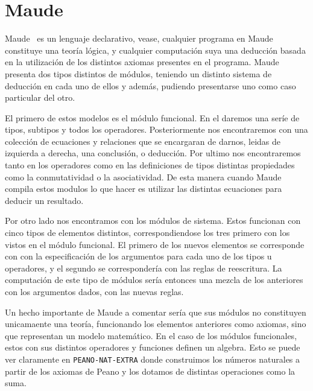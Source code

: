 
\section{Maude}

Maude~\cite{maudeBook} es un lenguaje declarativo, vease, cualquier programa en Maude constituye una teoría lógica, y cualquier computación suya una deducción basada en la utilización de los distintos axiomas presentes en el programa. Maude presenta dos tipos distintos de módulos, teniendo un distinto sistema de deducción en cada uno de ellos y además, pudiendo presentarse uno como caso particular del otro.\par

El primero de estos modelos es el módulo funcional. En el daremos una seríe de tipos, subtipos y todos los operadores. Posteriormente nos encontraremos con una colección de ecuaciones y relaciones que se encargaran de darnos, leidas de izquierda a derecha, una conclusión, o deducción. Por ultimo nos encontraremos tanto en los operadores como en las definiciones de tipos distintas propiedades como la conmutatividad o la asociatividad. De esta manera cuando Maude compila estos modulos lo que hacer es utilizar las distintas ecuaciones para deducir un resultado.\par

Por otro lado nos encontramos con los módulos de sistema. Estos funcionan con cinco tipos de elementos distintos, correspondiendose los tres primero con los vistos en el módulo funcional. El primero de los nuevos elementos se corresponde con con la especificación de los argumentos para cada uno de los tipos u operadores, y el segundo se correspondería con las reglas de reescritura. La computación de este tipo de módulos sería entonces una mezcla de los anteriores con los argumentos dados, con las nuevas reglas.\par

Un hecho importante de Maude a comentar sería que sus módulos no constituyen unicamaente una teoría, funcionando los elementos anteriores como axiomas, sino que representan un modelo matemático. En el caso de los módulos funcionales, estos con sus distintos operadores y funciones definen un algebra. Esto se puede ver claramente en \verb"PEANO-NAT-EXTRA" donde construimos los números naturales a partir de los axiomas de Peano y los dotamos de distintas operaciones como la suma.\par

